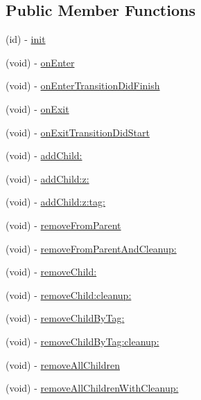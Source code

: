 \subsection*{Public Member Functions}
\begin{DoxyCompactItemize}
\item 
(id) -\/ \hyperlink{class_c_c_node_ad789cad83aca65c130abd4452d1bc081}{init}
\item 
(void) -\/ \hyperlink{class_c_c_node_aa63ddd790457e6a2f218aacecaf31462}{on\-Enter}
\item 
(void) -\/ \hyperlink{class_c_c_node_adc2725d4b53407cfa7ee901e6e4f7002}{on\-Enter\-Transition\-Did\-Finish}
\item 
(void) -\/ \hyperlink{class_c_c_node_af5b51ab87354940964d910e3a2f45516}{on\-Exit}
\item 
(void) -\/ \hyperlink{class_c_c_node_a3f92e1e9244df87644efbb7f6d0f7e0f}{on\-Exit\-Transition\-Did\-Start}
\item 
(void) -\/ \hyperlink{class_c_c_node_afa69e08c50aa394c748dcb585cbcb4df}{add\-Child\-:}
\item 
(void) -\/ \hyperlink{class_c_c_node_a6cebb9eeff360d832360a4f5efbbfa30}{add\-Child\-:z\-:}
\item 
(void) -\/ \hyperlink{class_c_c_node_ab3e142f4e18581046f811ae1489dd0c9}{add\-Child\-:z\-:tag\-:}
\item 
(void) -\/ \hyperlink{class_c_c_node_ad2d43e047941be667b57c71e1389bede}{remove\-From\-Parent}
\item 
(void) -\/ \hyperlink{class_c_c_node_a0d4e615f688458c74001acf10f0ae011}{remove\-From\-Parent\-And\-Cleanup\-:}
\item 
(void) -\/ \hyperlink{class_c_c_node_a8f8badc448b36ae3d6b92b248b5a53a5}{remove\-Child\-:}
\item 
(void) -\/ \hyperlink{class_c_c_node_a409c8fa79c0c6f26c7d84145f75d78ad}{remove\-Child\-:cleanup\-:}
\item 
(void) -\/ \hyperlink{class_c_c_node_a19ee0f645690265a85110b8b8ed793fa}{remove\-Child\-By\-Tag\-:}
\item 
(void) -\/ \hyperlink{class_c_c_node_aaea41be2508780d5870771ccd797fe54}{remove\-Child\-By\-Tag\-:cleanup\-:}
\item 
(void) -\/ \hyperlink{class_c_c_node_a906f6067b0bedf421619c60f93f8e982}{remove\-All\-Children}
\item 
(void) -\/ \hyperlink{class_c_c_node_a2d013deef5988b6c01fe5097147e02f3}{remove\-All\-Children\-With\-Cleanup\-:}
\item 

\end{DoxyCompactItemize}
